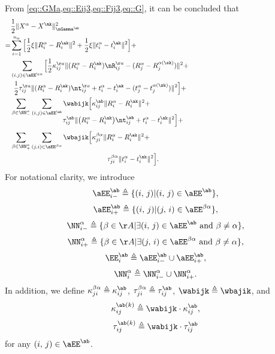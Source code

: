 From \cref{eq::GMa,eq::Eij3,eq::Fij3,eq::G}, it can be concluded that
\begingroup
\allowdisplaybreaks
\begin{equation}\label{eq::FaH}
	\begin{aligned}
	&\frac{1}{2}\|X^\alpha-X^{\ak}\|_{\nGamma^{\ak}}^2\\
=&\sum_{i=1}^{n_\alpha}\Big[\frac{1}{2}\xi\|R_i^\alpha-R_i^{\ak}\|^2 + \frac{1}{2}\xi\|t_i^\alpha-t_i^{\ak}\|^2\Big]+\hspace{5em}\\
&\sum_{(i,j)\in \aEE^{\aa}}\Big[\frac{1}{2}\kappa_{ij}^{\aa}\|(R_i^\alpha-R_i^{\ak})\nR_{ij}^{\aa} -(R_j^\alpha-R_j^{\alpha(\sk)})\|^2 +\hspace{17em}\\ 
&\;\,\frac{1}{2}\tau_{ij}^{\aa}\|(R_i^\alpha-R_i^{\ak}) \nt_{ij}^{\aa}+t_i^\alpha - t_i^{\ak} - (t_j^\alpha-t_j^{\alpha(\sk)})\|^2\Big]+\\
&\sum_{\substack{\beta\in \NN_-^\alpha}}\sum_{(i,j)\in \aEE^{\ab}}\wabijk\Big[\kappa_{ij}^{\ab}\|R_i^\alpha-R_i^{\ak}\|^2 +\\[-0.75em]
&\quad\quad\quad\quad\quad\quad\quad\;\;\tau_{ij}^{\ab}\|\big(R_i^\alpha-R_i^{\ak}\big) \nt_{ij}^{\ab}+t_i^\alpha-t_i^{\ak}\|^2\Big]+\\[0.3em]
&\sum_{\substack{\beta\in \NN_+^\alpha}}\sum_{(j,i)\in \aEE^{\beta\alpha}}\wbajik\Big[\kappa_{ji}^{\beta\alpha}\|R_i^\alpha -R_{i}^{\ak}\|^2+\\
&\quad\quad\quad\quad\hspace{10em}\tau_{ji}^{\beta\alpha}\|t_i^\alpha - t_{i}^{\ak}\|^2\Big].
	\end{aligned} 
\end{equation}
\endgroup
For notational clarity, we introduce
$$\aEE_{i-}^{\ab}\triangleq \{(i,\,j)|(i,\,j)\in \aEE^{\ab}\},$$
$$\aEE_{i+}^{\ab}\triangleq \{(i,\,j)|(j,\,i)\in \aEE^{\beta\alpha}\},$$
$$\NN_{i-}^{\alpha}\triangleq \{\beta\in \AA|\exists(i,\,j)\in \aEE^{\ab}\text{ and }\beta\neq\alpha\},$$
$$\NN_{i+}^{\alpha}\triangleq \{\beta\in \AA|\exists(j,\,i)\in \aEE^{\beta\alpha}\text{ and }\beta\neq\alpha\},$$ $$\EE_i^{\ab}\triangleq\aEE_{i-}^{\ab}\cup\aEE_{i+}^{\ab},$$
$$\NN_i^\alpha\triangleq\NN_{i-}^\alpha\cup\NN_{i+}^\alpha.$$ 
In addition, we define $\kappa_{ji}^{\beta\alpha}\triangleq\kappa_{ij}^{\ab}$, $\tau_{ji}^{\beta\alpha}\triangleq\tau_{ij}^{\ab}$, $\wabijk\triangleq\wbajik$, and
\begin{equation}\label{eq::kappak}
\kappa_{ij}^{\ab(k)}\triangleq \wabijk\cdot\kappa_{ij}^{\ab},
\end{equation}
\begin{equation}\label{eq::tauk}
\tau_{ij}^{\ab(k)}\triangleq \wabijk\cdot\tau_{ij}^{\ab}
\end{equation}
for any $(i,\,j)\in\aEE^{\ab}$. 

